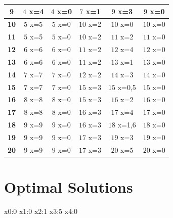 \documentclass{article}
\begin{document}
\begin{center}
\begin{tabular}{|c||c|c|c|c|c|}
        \hline
        \textbf{9}& \cellcolor[HTML]{3FFC45}$4$ x={4} & \cellcolor[HTML]{FC3F3F}$4$ x={0}& \cellcolor[HTML]{3FFC45}$7$ x={1} & \cellcolor[HTML]{3FFC45}$9$ x={3} & \cellcolor[HTML]{FC3F3F}$9$ x={0}\\
        \hline
        \textbf{10}& \cellcolor[HTML]{3FFC45}$5$ x={5} & \cellcolor[HTML]{FC3F3F}$5$ x={0}& \cellcolor[HTML]{3FFC45}$10$ x={2} & \cellcolor[HTML]{FC3F3F}$10$ x={0}& \cellcolor[HTML]{FC3F3F}$10$ x={0}\\
        \hline
        \textbf{11}& \cellcolor[HTML]{3FFC45}$5$ x={5} & \cellcolor[HTML]{FC3F3F}$5$ x={0}& \cellcolor[HTML]{3FFC45}$10$ x={2} & \cellcolor[HTML]{3FFC45}$11$ x={2} & \cellcolor[HTML]{FC3F3F}$11$ x={0}\\
        \hline
        \textbf{12}& \cellcolor[HTML]{3FFC45}$6$ x={6} & \cellcolor[HTML]{FC3F3F}$6$ x={0}& \cellcolor[HTML]{3FFC45}$11$ x={2} & \cellcolor[HTML]{3FFC45}$12$ x={4} & \cellcolor[HTML]{FC3F3F}$12$ x={0}\\
        \hline
        \textbf{13}& \cellcolor[HTML]{3FFC45}$6$ x={6} & \cellcolor[HTML]{FC3F3F}$6$ x={0}& \cellcolor[HTML]{3FFC45}$11$ x={2} & \cellcolor[HTML]{3FFC45}$13$ x={1} & \cellcolor[HTML]{FC3F3F}$13$ x={0}\\
        \hline
        \textbf{14}& \cellcolor[HTML]{3FFC45}$7$ x={7} & \cellcolor[HTML]{FC3F3F}$7$ x={0}& \cellcolor[HTML]{3FFC45}$12$ x={2} & \cellcolor[HTML]{3FFC45}$14$ x={3} & \cellcolor[HTML]{FC3F3F}$14$ x={0}\\
        \hline
        \textbf{15}& \cellcolor[HTML]{3FFC45}$7$ x={7} & \cellcolor[HTML]{FC3F3F}$7$ x={0}& \cellcolor[HTML]{3FFC45}$15$ x={3} & \cellcolor[HTML]{3F62FC}$15$ x={0,5}& \cellcolor[HTML]{FC3F3F}$15$ x={0}\\
        \hline
        \textbf{16}& \cellcolor[HTML]{3FFC45}$8$ x={8} & \cellcolor[HTML]{FC3F3F}$8$ x={0}& \cellcolor[HTML]{3FFC45}$15$ x={3} & \cellcolor[HTML]{3FFC45}$16$ x={2} & \cellcolor[HTML]{FC3F3F}$16$ x={0}\\
        \hline
        \textbf{17}& \cellcolor[HTML]{3FFC45}$8$ x={8} & \cellcolor[HTML]{FC3F3F}$8$ x={0}& \cellcolor[HTML]{3FFC45}$16$ x={3} & \cellcolor[HTML]{3FFC45}$17$ x={4} & \cellcolor[HTML]{FC3F3F}$17$ x={0}\\
        \hline
        \textbf{18}& \cellcolor[HTML]{3FFC45}$9$ x={9} & \cellcolor[HTML]{FC3F3F}$9$ x={0}& \cellcolor[HTML]{3FFC45}$16$ x={3} & \cellcolor[HTML]{3F62FC}$18$ x={1,6}& \cellcolor[HTML]{FC3F3F}$18$ x={0}\\
        \hline
        \textbf{19}& \cellcolor[HTML]{3FFC45}$9$ x={9} & \cellcolor[HTML]{FC3F3F}$9$ x={0}& \cellcolor[HTML]{3FFC45}$17$ x={3} & \cellcolor[HTML]{3FFC45}$19$ x={3} & \cellcolor[HTML]{FC3F3F}$19$ x={0}\\
        \hline
        \textbf{20}& \cellcolor[HTML]{3FFC45}$9$ x={9} & \cellcolor[HTML]{FC3F3F}$9$ x={0}& \cellcolor[HTML]{3FFC45}$17$ x={3} & \cellcolor[HTML]{3FFC45}$20$ x={5} & \cellcolor[HTML]{FC3F3F}$20$ x={0}\\
        \hline
    \end{tabular}
\end{center}


\section{Optimal Solutions}
x0:0 x1:0 x2:1 x3:5 x4:0 
\end{document}
